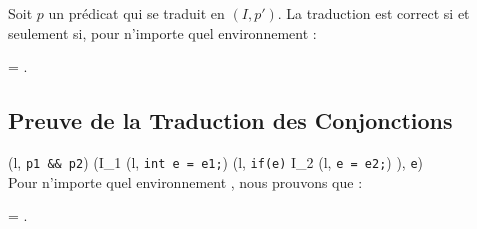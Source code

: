 \begin{lemma}\label{lem:pred-correct}
  Soit $p$ un prédicat qui se traduit en $(I, p')$.
  La traduction est correct si et seulement si, pour n'importe quel
  environnement \env :

   = .
\end{lemma}


\subsection{Preuve de la Traduction des Conjonctions}

{
  { (l, \mbox{\lstinline'p1 && p2'}) 
    (I_1 \cdot (l, \mbox{\lstinline'int e = e1;'}) \cdot
    (l, \mbox{\lstinline'if(e)'} \bopen I_2 \cdot
    (l, \mbox{\lstinline'e = e2;'}) \bclose ),
    \mbox{\lstinline'e'})
  }
}~\\

Pour n'importe quel environnement \env, nous prouvons que :

 = .


